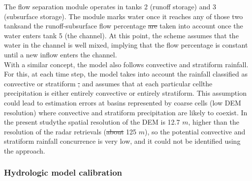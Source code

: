 \documentclass[hess, manuscript]{copernicus}
\providecommand{\DIFadd}[1]{{\protect\color{blue}\uwave{#1}}} %
\providecommand{\DIFdel}[1]{{\protect\color{red}\sout{#1}}}                      %
\providecommand{\DIFaddbegin}{} %
\providecommand{\DIFaddend}{} %
\providecommand{\DIFdelbegin}{} %
\providecommand{\DIFdelend}{} %
\begin{document}
The flow separation module operates in tanks 2 (runoff storage) and 3 (subsurface storage). The module marks water once it reaches any of those two tanks\DIFaddbegin \DIFadd{, }\DIFaddend and the runoff-subsurface flow percentage \DIFdelbegin \DIFdel{are }\DIFdelend \DIFaddbegin \DIFadd{is }\DIFaddend taken into account once the water enters tank 5 (the channel). At this point, the scheme assumes that the water in the channel is well mixed,  implying that the flow percentage is constant until a new inflow enters the channel.\\

With a similar concept, the model also follows convective and stratiform rainfall. For this, at each time step, the model takes into account the rainfall classified as convective or stratiform \DIFdelbegin \DIFdel{, }\DIFdelend and assumes that at each particular cell\DIFaddbegin \DIFadd{, }\DIFaddend the precipitation is either entirely convective or entirely stratiform. This assumption could lead to estimation errors at basins represented by coarse cells (low DEM resolution) where convective and stratiform precipitation are likely to coexist. In the present study\DIFaddbegin \DIFadd{, }\DIFaddend the spatial resolution of the DEM is 12.7 \DIFdelbegin \DIFdel{$m$}\DIFdelend \DIFaddbegin \DIFadd{m}\DIFaddend , higher than the resolution of the radar retrievals (\DIFdelbegin \DIFdel{about }\DIFdelend \DIFaddbegin \DIFadd{approximately }\DIFaddend 125 \DIFdelbegin \DIFdel{$m$}\DIFdelend \DIFaddbegin \DIFadd{m}\DIFaddend ), so the potential convective and stratiform rainfall concurrence is very low, and it could not be identified using the \cite{Steiner1995} approach.\\

\subsubsection{Hydrologic model calibration}
\end{document}
